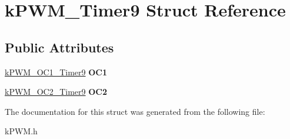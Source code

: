 \hypertarget{structkPWM__Timer9}{}\section{k\+P\+W\+M\+\_\+\+Timer9 Struct Reference}
\label{structkPWM__Timer9}
\subsection*{Public Attributes}
\begin{DoxyCompactItemize}
\item 
\hyperlink{structkPWM__OC1__Timer9}{k\+P\+W\+M\+\_\+\+O\+C1\+\_\+\+Timer9} {\bfseries O\+C1}\hypertarget{structkPWM__Timer9_ac48aad158b7e4f6b8791bcf8b239185d}{}\label{structkPWM__Timer9_ac48aad158b7e4f6b8791bcf8b239185d}

\item 
\hyperlink{structkPWM__OC2__Timer9}{k\+P\+W\+M\+\_\+\+O\+C2\+\_\+\+Timer9} {\bfseries O\+C2}\hypertarget{structkPWM__Timer9_a8d7aeb4c69bd79c3b266126886f572f3}{}\label{structkPWM__Timer9_a8d7aeb4c69bd79c3b266126886f572f3}

\end{DoxyCompactItemize}


The documentation for this struct was generated from the following file\+:\begin{DoxyCompactItemize}
\item 
k\+P\+W\+M.\+h\end{DoxyCompactItemize}
